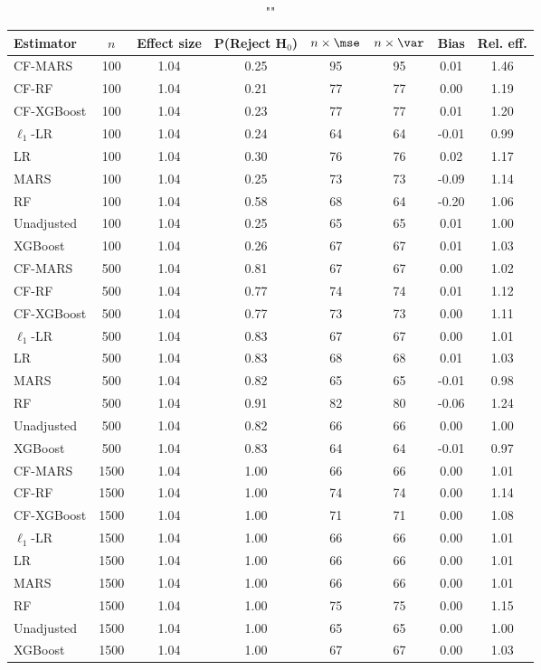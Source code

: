 \begin{table}
\centering
\caption{""}
\begin{tabular}{lccccccc}
\toprule
Estimator & $n$ & Effect size & P(Reject H$_0$) & $n\times\mse$ & $n\times \var$ & Bias & Rel. eff.\\ \midrule
CF-MARS & 100 & 1.04 & 0.25 & 95 & 95 &  0.01 & 1.46 \\ 
CF-RF & 100 & 1.04 & 0.21 & 77 & 77 &  0.00 & 1.19 \\ 
CF-XGBoost & 100 & 1.04 & 0.23 & 77 & 77 &  0.01 & 1.20 \\ 
$\ell_1$-LR & 100 & 1.04 & 0.24 & 64 & 64 & -0.01 & 0.99 \\ 
LR & 100 & 1.04 & 0.30 & 76 & 76 &  0.02 & 1.17 \\ 
MARS & 100 & 1.04 & 0.25 & 73 & 73 & -0.09 & 1.14 \\ 
RF & 100 & 1.04 & 0.58 & 68 & 64 & -0.20 & 1.06 \\ 
Unadjusted & 100 & 1.04 & 0.25 & 65 & 65 &  0.01 & 1.00 \\ 
XGBoost & 100 & 1.04 & 0.26 & 67 & 67 &  0.01 & 1.03 \\ \addlinespace 
CF-MARS & 500 & 1.04 & 0.81 & 67 & 67 &  0.00 & 1.02 \\ 
CF-RF & 500 & 1.04 & 0.77 & 74 & 74 &  0.01 & 1.12 \\ 
CF-XGBoost & 500 & 1.04 & 0.77 & 73 & 73 &  0.00 & 1.11 \\ 
$\ell_1$-LR & 500 & 1.04 & 0.83 & 67 & 67 &  0.00 & 1.01 \\ 
LR & 500 & 1.04 & 0.83 & 68 & 68 &  0.01 & 1.03 \\ 
MARS & 500 & 1.04 & 0.82 & 65 & 65 & -0.01 & 0.98 \\ 
RF & 500 & 1.04 & 0.91 & 82 & 80 & -0.06 & 1.24 \\ 
Unadjusted & 500 & 1.04 & 0.82 & 66 & 66 &  0.00 & 1.00 \\ 
XGBoost & 500 & 1.04 & 0.83 & 64 & 64 & -0.01 & 0.97 \\ \addlinespace 
CF-MARS & 1500 & 1.04 & 1.00 & 66 & 66 &  0.00 & 1.01 \\ 
CF-RF & 1500 & 1.04 & 1.00 & 74 & 74 &  0.00 & 1.14 \\ 
CF-XGBoost & 1500 & 1.04 & 1.00 & 71 & 71 &  0.00 & 1.08 \\ 
$\ell_1$-LR & 1500 & 1.04 & 1.00 & 66 & 66 &  0.00 & 1.01 \\ 
LR & 1500 & 1.04 & 1.00 & 66 & 66 &  0.00 & 1.01 \\ 
MARS & 1500 & 1.04 & 1.00 & 66 & 66 &  0.00 & 1.01 \\ 
RF & 1500 & 1.04 & 1.00 & 75 & 75 &  0.00 & 1.15 \\ 
Unadjusted & 1500 & 1.04 & 1.00 & 65 & 65 &  0.00 & 1.00 \\ 
XGBoost & 1500 & 1.04 & 1.00 & 67 & 67 &  0.00 & 1.03 \\
\bottomrule
\end{tabular}
\end{table}

